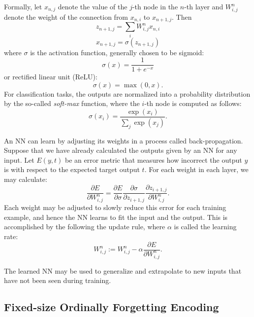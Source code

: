 \documentclass[11pt,a4paper]{article}
\begin{document}
Formally, let $x_{n,j}$ denote the value of the $j$-th node in the
$n$-th layer and $W^n_{i,j}$ denote the weight of the connection from
$x_{n,i}$ to $x_{n+1,j}$. Then
\begin{equation}
z_{n+1,j} = \sum_i W^n_{i,j} x_{n,i}
\end{equation}
\begin{equation}
x_{n+1,j} = \sigma\left(z_{n+1,j}\right)
\end{equation}
where $\sigma$ is the activation function, generally chosen to be sigmoid:
\begin{equation}
\sigma(x) = \frac{1}{1 + e^{-x}}
\end{equation}
or rectified linear unit (ReLU):
\begin{equation}
\sigma(x) = \max(0, x).
\end{equation}
For classification tasks, the outputs are normalized into a probability distribution by the so-called {\it soft-max} function, where the $i$-th node is computed as follows:
\begin{equation}
\sigma(x_i) =  \frac{\exp(x_i)}{\sum_{j} \exp(x_j)}.
\end{equation}

An NN can learn by adjusting its weights in a process called back-propagation. 
Suppose that we have already calculated the outputs given by an NN for any input.
Let $E(y,t)$ be an error metric that measures how incorrect the output
$y$ is with respect to the expected target output $t$. For each weight
in each layer, we may calculate:
\begin{equation}
\frac{\partial E}{\partial W^n_{i,j}} = \frac{\partial E}{\partial
	\sigma} \frac{\partial \sigma}{\partial z_{i+1,j}} \frac{\partial
	z_{i+1,j}}{\partial W^n_{i,j}}.
\end{equation}
Each weight may be adjusted to slowly reduce this error for each training
example, and hence the NN learns to fit the input and the output. 
This is accomplished by the following the update rule, where $\alpha$ is called the learning rate:
\begin{equation}
W^n_{i,j} := W^n_{i,j} - \alpha \frac{\partial E}{\partial
	W^n_{i,j}}.
\end{equation}

The learned NN may be used to generalize and extrapolate to new inputs that have not been seen during training.

\subsection{Fixed-size Ordinally Forgetting Encoding}
\end{document}
